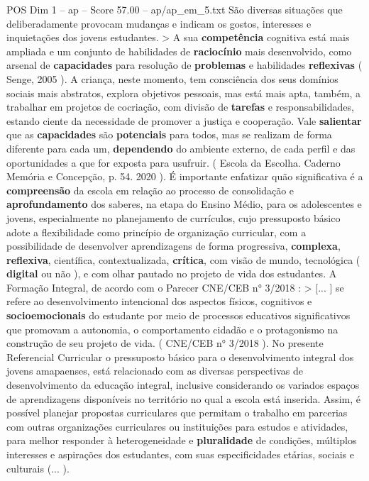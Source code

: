 \begin{textsample}{POS Dim 1 – ap – Score 57.00 – ap/ap\_em\_5.txt}
São diversas situações que deliberadamente provocam mudanças e indicam os gostos, interesses e inquietações dos jovens estudantes. > A sua \textbf{competência} cognitiva está mais ampliada e um conjunto de habilidades de \textbf{raciocínio} mais desenvolvido, como arsenal de \textbf{capacidades} para resolução de \textbf{problemas} e habilidades \textbf{reflexivas} ( Senge, 2005 ).
A criança, neste momento, tem consciência dos seus domínios sociais mais abstratos, explora objetivos pessoais, mas está mais apta, também, a trabalhar em projetos de cocriação, com divisão de \textbf{tarefas} e responsabilidades, estando ciente da necessidade de promover a justiça e cooperação.
Vale \textbf{salientar} que as \textbf{capacidades} são \textbf{potenciais} para todos, mas se realizam de forma diferente para cada um, \textbf{dependendo} do ambiente externo, de cada perfil e das oportunidades a que for exposta para usufruir. ( Escola da Escolha.
Caderno Memória e Concepção, p. 54. 2020 ).
É importante enfatizar quão significativa é a \textbf{compreensão} da escola em relação ao processo de consolidação e \textbf{aprofundamento} dos saberes, na etapa do Ensino Médio, para os adolescentes e jovens, especialmente no planejamento de currículos, cujo pressuposto básico adote a flexibilidade como princípio de organização curricular, com a possibilidade de desenvolver aprendizagens de forma progressiva, \textbf{complexa}, \textbf{reflexiva}, científica, contextualizada, \textbf{crítica}, com visão de mundo, tecnológica ( \textbf{digital} ou não ), e com olhar pautado no projeto de vida dos estudantes.
A Formação Integral, de acordo com o Parecer CNE/CEB n{\EmojiFont °} 3/2018 : > [... ] se refere ao desenvolvimento intencional dos aspectos físicos, cognitivos e \textbf{socioemocionais} do estudante por meio de processos educativos significativos que promovam a autonomia, o comportamento cidadão e o protagonismo na construção de seu projeto de vida. ( CNE/CEB n{\EmojiFont °} 3/2018 ).
No presente Referencial Curricular o pressuposto básico para o desenvolvimento integral dos jovens amapaenses, está relacionado com as diversas perspectivas de desenvolvimento da educação integral, inclusive considerando os variados espaços de aprendizagens disponíveis no território no qual a escola está inserida.
Assim, é possível planejar propostas curriculares que permitam o trabalho em parcerias com outras organizações curriculares ou instituições para estudos e atividades, para melhor responder à heterogeneidade e \textbf{pluralidade} de condições, múltiplos interesses e aspirações dos estudantes, com suas especificidades etárias, sociais e culturais (... ).

\end{textsample}
